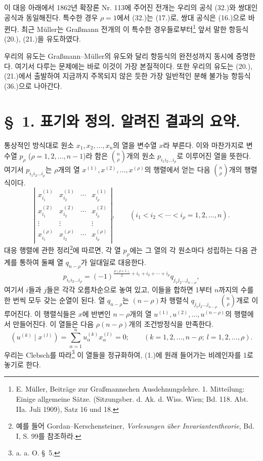 이 대응 아래에서 1862년 확장론 Nr. 113에 주어진 전개는 우리의 공식 (32.)와 쌍대인 공식과 동일해진다. 특수한 경우 $\rho=1$에서 (32.)는 (17.)로, 쌍대 공식은 (16.)으로 바뀐다. 최근 Müller는 Graßmann 전개의 이 특수한 경우들로부터\footnote{E. Müller, Beiträge zur Graßmannschen Ausdehnungslehre. 1. Mitteilung: Einige allgemeine Sätze. (Sitzungsber. d. Ak. d. Wiss. Wien; Bd. 118. Abt. IIa. Juli 1909), Satz 16 und 18.} 앞서 말한 항등식 (20.), (21.)을 유도하였다.

우리의 유도는 Graßmann--Müller의 유도와 달리 항등식의 완전성까지 동시에 증명한다. 여기서 다루는 문제에는 바로 이것이 가장 본질적이다. 또한 우리의 유도는 (20.), (21.)에서 출발하여 지금까지 주목되지 않은 듯한 가장 일반적인 분해 불가능 항등식 (36.)으로 나아간다.

\section*{\S\ 1. 표기와 정의. 알려진 결과의 요약.}
통상적인 방식대로 원소 $x_1,x_2,\ldots,x_n$의 열을 변수열 $x$라 부른다. 이와 마찬가지로 변수열 $p_\rho$ ($\rho=1,2,\ldots,n-1$)라 함은 $\binom n\rho$개의 원소 $p_{i_1i_2\ldots i_\rho}$로 이루어진 열을 뜻한다. 여기서 $p_{i_1i_2\ldots i_\rho}$는 $\rho$개의 열 $x^{(1)},x^{(2)},\ldots,x^{(\rho)}$의 행렬에서 얻는 다음 $\binom n\rho$개의 행렬식이다.
\[
\left|\begin{array}{cccc}
 x_{i_1}^{(1)}&x_{i_2}^{(1)}&\cdots&x_{i_\rho}^{(1)}\\
 x_{i_1}^{(2)}&x_{i_2}^{(2)}&\cdots&x_{i_\rho}^{(2)}\\
 \vdots&\vdots&&\vdots\\
 x_{i_1}^{(\rho)}&x_{i_2}^{(\rho)}&\cdots&x_{i_\rho}^{(\rho)}
\end{array}\right|,
\qquad (i_1<i_2<\cdots<i_\rho=1,2,\ldots,n).
\]
대응 행렬에 관한 정리\footnote{예를 들어 Gordan--Kerschensteiner, \emph{Vorlesungen über Invariantentheorie}, Bd. I, S. 99를 참조하라.}에 따르면, 각 열 $p_\rho$에는 그 열의 각 원소마다 성립하는 다음 관계를 통하여 둘째 열 $q_{n-\rho}$가 일대일로 대응한다.
\begin{equation}
 p_{i_1i_2\ldots i_\rho}=(-1)^{\frac{\rho(\rho+1)}{2}+i_1+i_2+\cdots+i_\rho}q_{j_1j_2\ldots j_{n-\rho}},
\tag{1}
\end{equation}
여기서 $i$들과 $j$들은 각각 오름차순으로 놓여 있고, 이들을 합하면 1부터 $n$까지의 수를 한 번씩 모두 갖는 순열이 된다. 열 $q_{n-\rho}$는 $(n-\rho)$차 행렬식 $q_{j_1j_2\ldots j_{n-\rho}}$ $\binom n\rho$개로 이루어진다. 이 행렬식들은 $x$에 반변인 $n-\rho$개의 열 $u^{(1)},u^{(2)},\ldots,u^{(n-\rho)}$의 행렬에서 만들어진다. 이 열들은 다음 $\rho(n-\rho)$개의 조건방정식을 만족한다.
\begin{equation}
 (u^{(k)}\mid x^{(l)})=\sum_{\alpha=1}^{n}u_\alpha^{(k)}x_\alpha^{(l)}=0;
 \qquad (k=1,2,\ldots,n-\rho;\ l=1,2,\ldots,\rho).
\tag{2}
\end{equation}
우리는 Clebsch를 따라\footnote{a. a. O. \S\ 5.} 이 열들을 정규화하여, (1.)에 원래 들어가는 비례인자를 1로 놓기로 한다.


